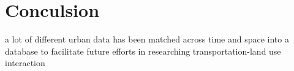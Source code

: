 \chapter{Conculsion} \label{ch:conclusion}

a lot of different urban data has been matched across time and space into a database to facilitate future efforts in researching transportation-land use interaction